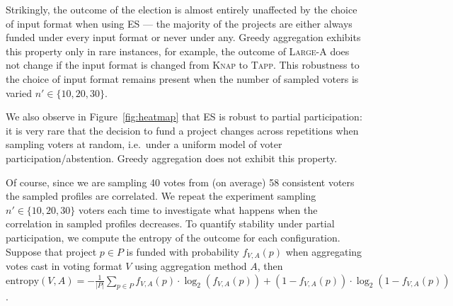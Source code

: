 \documentclass[letterpaper]{article} %
\newcommand{\kibitz}[2]{\ifnum\Comments=1{\color{#1}{#2}}\fi}
\newcommand{\kg}[1]{\kibitz{red}{[Kobi says:#1]}}
\newcommand{\knap}{\textsc{Knap}}
\newcommand{\tapp}{\textsc{Tapp}}
\newcommand{\mes}{ES}
\begin{document}
Strikingly, the outcome of the election is almost entirely unaffected by the choice of input format when using \mes{} --- the majority of the projects are either always funded under every input format or never under any. Greedy aggregation exhibits this property only in rare instances, for example, the outcome of \textsc{Large-A} does not change if the input format is changed from \knap{} to \tapp.  This robustness to the choice of input format remains present when the number of sampled voters is varied $n'\in\{10,20,30\}.$

We also observe in   Figure~\ref{fig:heatmap} that \mes{} is robust to partial participation: it is very rare that the decision to fund a project changes across repetitions when sampling voters at random, i.e.\ under a uniform model of voter participation/abstention. Greedy aggregation does not exhibit this property. 

Of course, since we are sampling 40 votes from (on average) 58 consistent voters the sampled profiles are correlated. We repeat the experiment sampling $n'\in\{10,20,30\}$ voters each time to investigate what happens when the correlation in sampled profiles decreases.
%
To quantify stability under partial participation, we compute the entropy of the outcome for each configuration. Suppose that project $p\in P$ is funded with probability $f_{V,A}(p)$ when aggregating votes cast in voting format $V$ using aggregation method $A$, then $\text{entropy}(V,A) = -\frac{1}{|P|}\sum_{p\in P} f_{V,A}(p) \cdot \log_2(f_{V,A}(p)) + (1 - f_{V,A}(p)) \cdot \log_2(1 - f_{V,A}(p))$.



 
\end{document}
